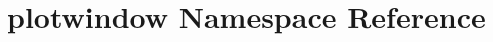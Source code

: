 \hypertarget{namespaceplotwindow}{\section{plotwindow Namespace Reference}
\label{namespaceplotwindow}
}
